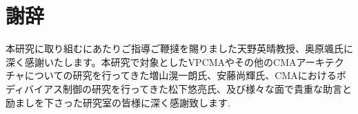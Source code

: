 \chapter{謝辞}
{
本研究に取り組むにあたりご指導ご鞭撻を賜りました天野英晴教授、奥原颯氏に深く感謝いたします。本研究で対象としたVPCMAやその他のCMAアーキテクチャについての研究を行ってきた増山滉一朗氏、安藤尚輝氏、CMAにおけるボディバイアス制御の研究を行ってきた松下悠亮氏、及び様々な面で貴重な助言と励ましを下さった研究室の皆様に深く感謝致します.
}
